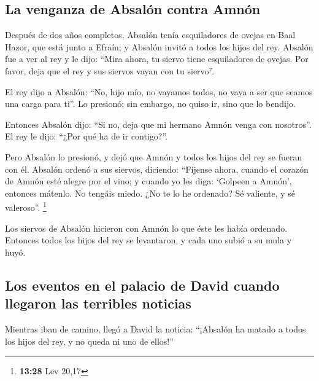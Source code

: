 \hypertarget{la-venganza-de-absaluxf3n-contra-amnuxf3n}{%
\subsection{La venganza de Absalón contra
Amnón}\label{la-venganza-de-absaluxf3n-contra-amnuxf3n}}

 Después de dos años completos, Absalón tenía
esquiladores de ovejas en Baal Hazor, que está junto a Efraín; y Absalón
invitó a todos los hijos del rey.  Absalón fue a ver al
rey y le dijo: ``Mira ahora, tu siervo tiene esquiladores de ovejas. Por
favor, deja que el rey y sus siervos vayan con tu siervo''.

 El rey dijo a Absalón: ``No, hijo mío, no vayamos todos,
no vaya a ser que seamos una carga para ti''. Lo presionó; sin embargo,
no quiso ir, sino que lo bendijo.

 Entonces Absalón dijo: ``Si no, deja que mi hermano
Amnón venga con nosotros''. El rey le dijo: ``¿Por qué ha de ir
contigo?''.

 Pero Absalón lo presionó, y dejó que Amnón y todos los
hijos del rey se fueran con él.  Absalón ordenó a sus
siervos, diciendo: ``Fíjense ahora, cuando el corazón de Amnón esté
alegre por el vino; y cuando yo les diga: `Golpeen a Amnón', entonces
mátenlo. No tengáis miedo. ¿No te lo he ordenado? Sé valiente, y sé
valeroso''. \footnote{\textbf{13:28} Lev 20,17}

 Los siervos de Absalón hicieron con Amnón lo que éste
les había ordenado. Entonces todos los hijos del rey se levantaron, y
cada uno subió a su mula y huyó.

\hypertarget{los-eventos-en-el-palacio-de-david-cuando-llegaron-las-terribles-noticias}{%
\subsection{Los eventos en el palacio de David cuando llegaron las
terribles
noticias}\label{los-eventos-en-el-palacio-de-david-cuando-llegaron-las-terribles-noticias}}

 Mientras iban de camino, llegó a David la noticia:
``¡Absalón ha matado a todos los hijos del rey, y no queda ni uno de
ellos!''

